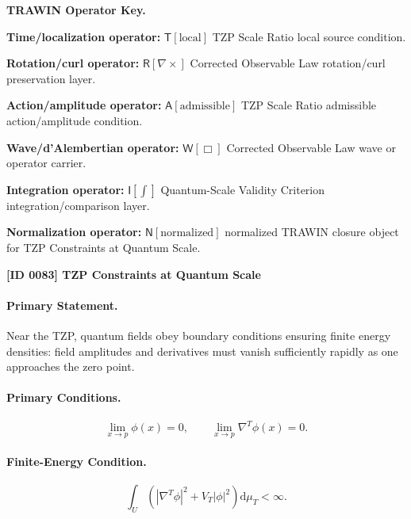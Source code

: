 \par\vspace{0.45\baselineskip}
\noindent\begin{minipage}[t]{\linewidth}
\begingroup
\small
\raggedright
\textbf{TRAWIN Operator Key.}\par
\noindent\textbf{Time/localization operator:} $\mathsf{T}\!\left[\mathrm{local}\right]$ TZP Scale Ratio local source condition.\par
\noindent\textbf{Rotation/curl operator:} $\mathsf{R}\!\left[\nabla\times\right]$ Corrected Observable Law rotation/curl preservation layer.\par
\noindent\textbf{Action/amplitude operator:} $\mathsf{A}\!\left[\mathrm{admissible}\right]$ TZP Scale Ratio admissible action/amplitude condition.\par
\noindent\textbf{Wave/d'Alembertian operator:} $\mathsf{W}\!\left[\Box\right]$ Corrected Observable Law wave or operator carrier.\par
\noindent\textbf{Integration operator:} $\mathsf{I}\!\left[\int\right]$ Quantum-Scale Validity Criterion integration/comparison layer.\par
\noindent\textbf{Normalization operator:} $\mathsf{N}\!\left[\mathrm{normalized}\right]$ normalized TRAWIN closure object for TZP Constraints at Quantum Scale.\par
\endgroup
\end{minipage}

\clearpage
\noindent\textbf{[ID 0083] TZP Constraints at Quantum Scale}\par
\vspace{0.35em}
\paragraph{Primary Statement.}
Near the TZP, quantum fields obey boundary conditions ensuring finite energy densities: field amplitudes and derivatives must vanish sufficiently rapidly as one approaches the zero point.

\paragraph{Primary Conditions.}
\begin{equation}
\lim_{x\to p}\phi(x)=0,
\qquad
\lim_{x\to p}\nabla^T\phi(x)=0 .
\end{equation}

\paragraph{Finite-Energy Condition.}
\begin{equation}
\int_U
\left(
|\nabla^T\phi|^2
+
V_T|\phi|^2
\right)
\mathrm{d}\mu_T
<\infty .
\end{equation}

